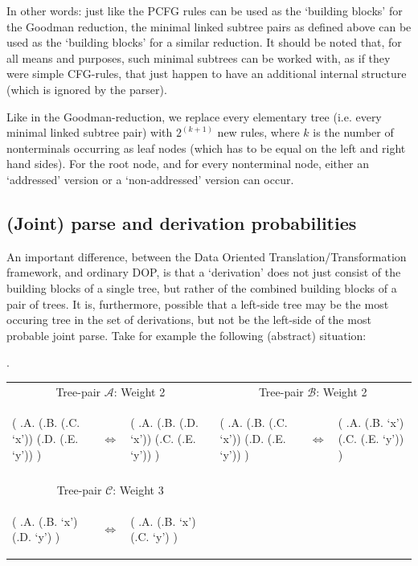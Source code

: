 \documentclass[a4paper]{article}
\theoremstyle{definition}
\begin{document}
In other words: just like the PCFG rules can be used as the `building blocks'
for the Goodman reduction, the minimal linked subtree pairs as defined above
can be used as the `building blocks' for a similar reduction. It should be
noted that, for all means and purposes, such minimal subtrees can be worked
with, as if they were simple CFG-rules, that just happen to have an additional
internal structure (which is ignored by the parser).

Like in the Goodman-reduction, we replace every elementary tree (i.e. every
minimal linked subtree pair) with $2^{(k+1)}$ new rules, where $k$ is the
number of nonterminals occurring as leaf nodes (which has to be equal on the
left and right hand sides). For the root node, and for every nonterminal node,
either an `addressed' version or a `non-addressed' version can occur.

\subsection{(Joint) parse and derivation probabilities}

An important difference, between the Data Oriented Translation/Transformation framework, and ordinary DOP, is that a `derivation' does not just consist of the building blocks of a single tree, but rather of the combined building blocks of a pair of trees. It is, furthermore, possible that a left-side tree may be the most occuring tree in the set of derivations, but not be the left-side of the most probable joint parse. Take for example the following (abstract) situation:

\ex. \label{abstractexample}

\begin{tabular}{llllll}
\multicolumn{3}{c}{Tree-pair $\mathcal{A}$: Weight 2} &
\multicolumn{3}{c}{Tree-pair $\mathcal{B}$: Weight 2} \\
\begin{parsetree}
( .A.
    (.B. (.C. `x'))
    (.D. (.E. `y'))
)
\end{parsetree}
& $\iff$ &
\begin{parsetree}
( .A.
    (.B. (.D. `x'))
    (.C. (.E. `y'))
)
\end{parsetree}
&
\begin{parsetree}
( .A.
    (.B. (.C. `x'))
    (.D. (.E. `y'))
)
\end{parsetree}
& $\iff$ &
\begin{parsetree}
( .A.
    (.B. `x')
    (.C. (.E. `y'))
)
\end{parsetree} \\
& & \\
\multicolumn{3}{c}{Tree-pair $\mathcal{C}$: Weight 3} & \\
\begin{parsetree}
( .A.
    (.B. `x')
    (.D. `y')
)
\end{parsetree}
& $\iff$ &
\begin{parsetree}
( .A.
    (.B. `x')
    (.C. `y')
)
\end{parsetree}

\end{tabular}
\vspace{1em}
\end{document}
